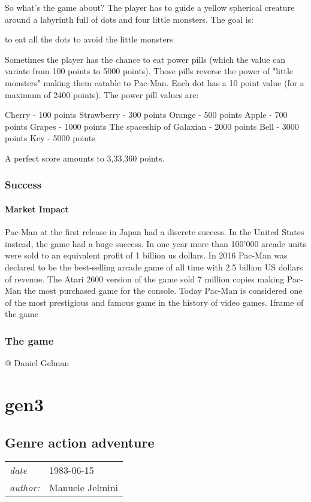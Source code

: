 \documentclass[a4paper,10pt]{book}
\newcommand{\pageHeader}[4]{
    \section{#1}
    \vspace{-0.3cm}
    \begin{table}[h!]
     \begin{tabular}{ll}
        \hline
        \textit{date} & #2 \\
        \textit{author: } & #3\\
        \hline
     \end{tabular}
    \end{table}
    \vspace{-0.3cm}
}
\begin{document}
                So what's the game about?   The player has to guide a yellow spherical creature around a labyrinth full of dots and four little monsters. The goal is:
                 
 to eat all the dots 
 to avoid the little monsters 
 
                Sometimes the player has the chance to eat power pills (which the value can variate from 100 points to 5000 points). Those pills reverse the power of "little monsters" making them eatable to Pac-Man. Each dot has a 10 point value (for a maximum of 2400
                points). The power pill values are:
                 
 Cherry - 100 points 
 Strawberry - 300 points 
 Orange - 500 points 
 Apple - 700 points 
 Grapes - 1000 points 
 The spaceship of Galaxian - 2000 points 
 Bell - 3000 points 
 Key - 5000 points 
 
                A perfect score amounts to 3,33,360 points.
             
 
 \subsection{Success }
 \subsubsection{Market Impact }
            Pac-Man at the first release in Japan had a discrete success. In the United States instead, the game had a huge success.   In one year more than 100'000 arcade units were sold to an equivalent profit of 1 billion us dollars. In 2016 Pac-Man
            was declared to be the best-selling arcade game of all time with 2.5 billion US dollars of revenue. The Atari 2600 version of the game sold 7 million copies making Pac-Man the most purchased game for the console. Today Pac-Man is considered
            one of the most prestigious and famous game in the history of video games.
               \textbf{}   \textit{}
  Iframe of the game  
 
 \subsection{The game }
 
 
 
 
 @ Daniel Gelman 
 
 
 \newpage\chapter{gen3}\newpage\pageHeader{Genre action adventure}{1983-06-15}{Manuele Jelmini}{The action-adventure genre in the third generation}
\end{document}
